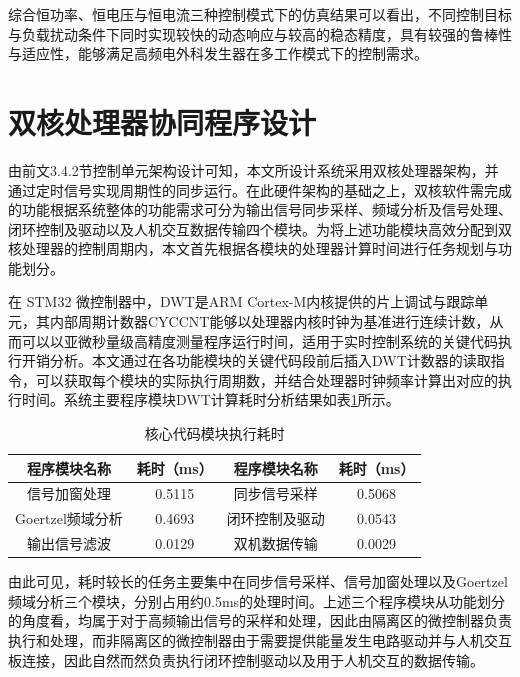 综合恒功率、恒电压与恒电流三种控制模式下的仿真结果可以看出，不同控制目标与负载扰动条件下同时实现较快的动态响应与较高的稳态精度，具有较强的鲁棒性与适应性，能够满足高频电外科发生器在多工作模式下的控制需求。

\section{双核处理器协同程序设计}
由前文3.4.2节控制单元架构设计可知，本文所设计系统采用双核处理器架构，并通过定时信号实现周期性的同步运行。在此硬件架构的基础之上，双核软件需完成的功能根据系统整体的功能需求可分为输出信号同步采样、频域分析及信号处理、闭环控制及驱动以及人机交互数据传输四个模块。为将上述功能模块高效分配到双核处理器的控制周期内，本文首先根据各模块的处理器计算时间进行任务规划与功能划分。

在 STM32 微控制器中，DWT是ARM Cortex-M内核提供的片上调试与跟踪单元，其内部周期计数器CYCCNT能够以处理器内核时钟为基准进行连续计数，从而可以以亚微秒量级高精度测量程序运行时间，适用于实时控制系统的关键代码执行开销分析。本文通过在各功能模块的关键代码段前后插入DWT计数器的读取指令，可以获取每个模块的实际执行周期数，并结合处理器时钟频率计算出对应的执行时间。系统主要程序模块DWT计算耗时分析结果如表\ref{dwt_time}所示。
\begin{table}[htbp]
	\caption{\label{dwt_time}核心代码模块执行耗时}
	\centering
	\small
	\setlength{\tabcolsep}{20pt}
	\begin{tabular}{c c c c }
		\hline
		程序模块名称       & 耗时（ms） & 程序模块名称  & 耗时（ms） \\
		\hline
		信号加窗处理       & 0.5115 & 同步信号采样  & 0.5068 \\
		Goertzel频域分析 & 0.4693 & 闭环控制及驱动 & 0.0543 \\
		输出信号滤波       & 0.0129 & 双机数据传输  & 0.0029 \\
		\hline
	\end{tabular}
\end{table}

由此可见，耗时较长的任务主要集中在同步信号采样、信号加窗处理以及Goertzel频域分析三个模块，分别占用约0.5ms的处理时间。上述三个程序模块从功能划分的角度看，均属于对于高频输出信号的采样和处理，因此由隔离区的微控制器负责执行和处理，而非隔离区的微控制器由于需要提供能量发生电路驱动并与人机交互板连接，因此自然而然负责执行闭环控制驱动以及用于人机交互的数据传输。

